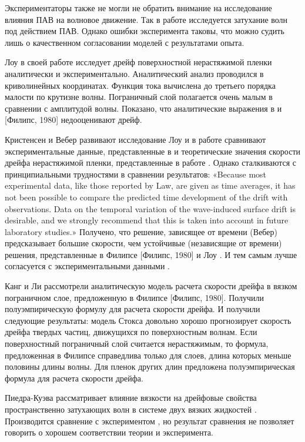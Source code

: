 Экспериментаторы также не могли не обратить внимание на исследование влияния ПАВ на волновое движение. Так в работе \cite{huhnerfuss1981damping} исследуется затухание волн под действием ПАВ. Однако ошибки эксперимента таковы, что можно судить лишь о качественном согласовании моделей с результатами опыта.

Лоу в своей работе \cite{law1999wave} исследует дрейф поверхностной нерастяжимой пленки аналитически и экспериментально. Аналитический анализ проводился в криволинейных координатах. Функция тока вычислена до третьего порядка малости по крутизне волны. Пограничный слой полагается очень малым в сравнении с амплитудой волны. Показано, что аналитические выражения в \cite{law1999wave} и [Филипс, 1980]  недооценивают дрейф.

Кристенсен и Вебер развивают исследование Лоу и в работе \cite{christensen2005drift} сравнивают экспериментальные данные, представленные в \cite{law1999wave} и теоретические значения скорости дрейфа нерастяжимой пленки, представленные в работе \cite{weber1987wave}.  Однако сталкиваются с принципиальными трудностями в сравнении результатов: «Because most experimental data, like those reported by Law, are given as time averages, it has not been possible to compare the predicted time development of the drift with observations. Data on the temporal variation of the wave-induced surface drift is desirable, and we strongly recommend that this is taken into account in future laboratory studies.»
Получено, что решение, зависящее от времени (Вебер) предсказывает большие скорости, чем устойчивые (независящие от времени) решения, представленные в Филипсе [Филипс, 1980] и Лоу \cite{law1999wave}. И тем самым лучше согласуется с экспериментальными данными \cite{law1999wave}.


Канг и Ли \cite{kang1996prediction} рассмотрели аналитическую модель расчета скорости дрейфа в вязком пограничном слое, предложенную в Филипсе [Филипс, 1980]. Получили полуэмпирическую формулу для расчета скорости дрейфа. И получили следующие результаты: модель Стокса довольно хорошо прогнозирует скорость дрейфа твердых частиц, движущихся по поверхностным волнам. Если поверхностный пограничный слой считается нерастяжимым, то формула, предложенная в Филипсе справедлива только для слоев, длина которых меньше половины длины волны. Для пленок других длин предложена полуэмпирическая формула для расчета скорости дрейфа.

Пиедра-Куэва  рассматривает влияние вязкости на дрейфовые свойства пространственно затухающих волн в системе двух вязких жидкостей \cite{piedra1995drift,piedra1996drift}. Производится сравнение с экспериментом \cite{sakakiyama1989mass}, но результат сравнения не позволяет говорить о хорошем соответствии теории и эксперимента. 

